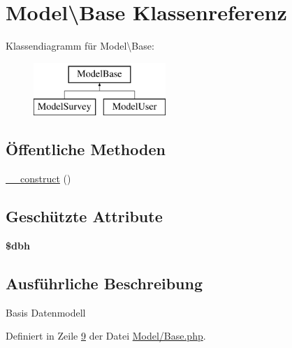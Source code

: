 \hypertarget{class_model_1_1_base}{\section{Model\textbackslash{}Base Klassenreferenz}
\label{class_model_1_1_base}
}
Klassendiagramm für Model\textbackslash{}Base\-:\begin{figure}[H]
\begin{center}
\leavevmode
\includegraphics[height=2.000000cm]{class_model_1_1_base}
\end{center}
\end{figure}
\subsection*{Öffentliche Methoden}
\begin{DoxyCompactItemize}
\item 
\hyperlink{class_model_1_1_base_a72e3b51dec693b4a3f33f445e837d7e8}{\-\_\-\-\_\-construct} ()
\end{DoxyCompactItemize}
\subsection*{Geschützte Attribute}
\begin{DoxyCompactItemize}
\item 
\hypertarget{class_model_1_1_base_a10c7d143c93e0976d53f9e5ab126b1c4}{{\bfseries \$dbh}}\label{class_model_1_1_base_a10c7d143c93e0976d53f9e5ab126b1c4}

\end{DoxyCompactItemize}


\subsection{Ausführliche Beschreibung}
Basis Datenmodell 

Definiert in Zeile \hyperlink{_model_2_base_8php_source_l00009}{9} der Datei \hyperlink{_model_2_base_8php_source}{Model/\-Base.\-php}.



